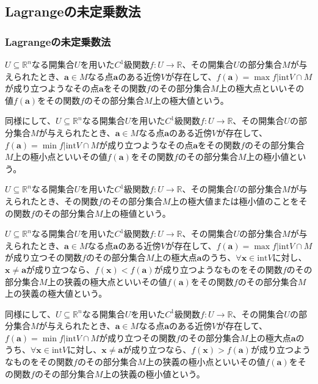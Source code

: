 \documentclass[dvipdfmx]{jsarticle}
\begin{document}
\subsection{Lagrangeの未定乗数法}%
\subsubsection{Lagrangeの未定乗数法}%
\begin{dfn}
$U \subseteq \mathbb{R}^{n}$なる開集合$U$を用いた$C^{1}$級関数$f:U \rightarrow \mathbb{R}$、その開集合$U$の部分集合$M$が与えられたとき、$\mathbf{a} \in M$なる点$\mathbf{a}$のある近傍$V$が存在して、$f\left( \mathbf{a} \right) = \max{f|\mathrm{int}V \cap M}$が成り立つようなその点$\mathbf{a}$をその関数$f$のその部分集合$M$上の極大点といいその値$f\left( \mathbf{a} \right)$をその関数$f$のその部分集合$M$上の極大値という。\par
同様にして、$U \subseteq \mathbb{R}^{n}$なる開集合$U$を用いた$C^{1}$級関数$f:U \rightarrow \mathbb{R}$、その開集合$U$の部分集合$M$が与えられたとき、$\mathbf{a} \in M$なる点$\mathbf{a}$のある近傍$V$が存在して、$f\left( \mathbf{a} \right) = \min{f|\mathrm{int}V \cap M}$が成り立つようなその点$\mathbf{a}$をその関数$f$のその部分集合$M$上の極小点といいその値$f\left( \mathbf{a} \right)$をその関数$f$のその部分集合$M$上の極小値という。
\end{dfn}
\begin{dfn}
$U \subseteq \mathbb{R}^{n}$なる開集合$U$を用いた$C^{1}$級関数$f:U \rightarrow \mathbb{R}$、その開集合$U$の部分集合$M$が与えられたとき、その関数$f$のその部分集合$M$上の極大値または極小値のことをその関数$f$のその部分集合$M$上の極値という。
\end{dfn}
\begin{dfn}
$U \subseteq \mathbb{R}^{n}$なる開集合$U$を用いた$C^{1}$級関数$f:U \rightarrow \mathbb{R}$、その開集合$U$の部分集合$M$が与えられたとき、$\mathbf{a} \in M$なる点$\mathbf{a}$のある近傍$V$が存在して、$f\left( \mathbf{a} \right) = \max{f|\mathrm{int}V \cap M}$が成り立つその関数$f$のその部分集合$M$上の極大点$\mathbf{a}$のうち、$\forall\mathbf{x} \in \mathrm{int}V$に対し、$\mathbf{x} \neq \mathbf{a}$が成り立つなら、$f\left( \mathbf{x} \right) < f\left( \mathbf{a} \right)$が成り立つようなものをその関数$f$のその部分集合$M$上の狭義の極大点といいその値$f\left( \mathbf{a} \right)$をその関数$f$のその部分集合$M$上の狭義の極大値という。\par
同様にして、$U \subseteq \mathbb{R}^{n}$なる開集合$U$を用いた$C^{1}$級関数$f:U \rightarrow \mathbb{R}$、その開集合$U$の部分集合$M$が与えられたとき、$\mathbf{a} \in M$なる点$\mathbf{a}$のある近傍$V$が存在して、$f\left( \mathbf{a} \right) = \min{f|\mathrm{int}V \cap M}$が成り立つその関数$f$のその部分集合$M$上の極大点$\mathbf{a}$のうち、$\forall\mathbf{x} \in \mathrm{int}V$に対し、$\mathbf{x} \neq \mathbf{a}$が成り立つなら、$f\left( \mathbf{x} \right) > f\left( \mathbf{a} \right)$が成り立つようなものをその関数$f$のその部分集合$M$上の狭義の極小点といいその値$f\left( \mathbf{a} \right)$をその関数$f$のその部分集合$M$上の狭義の極小値という。
\end{dfn}
\end{document}
